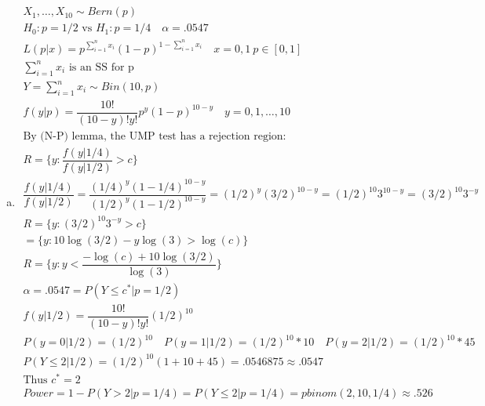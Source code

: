 \documentclass{article}
\newcommand{\sumx}{\sum_{i=1}^{n}x_i}
\begin{document}
\begin{flushleft}
\begin{enumerate}[(a)]
	\item 
\begin{multline*}\\
X_1,\dots,X_{10} \sim Bern(p)\\
H_0:p=1/2 \text{ vs } H_1:p=1/4 \quad \alpha=.0547\\
L(p|x)=p^{\sumx}(1-p)^{1-\sumx} \quad x= 0,1 \ p\in [0,1]\\
\sumx \text{ is an SS for p}\\
Y=\sumx\sim Bin(10,p)\\
f(y|p)=\dfrac{10!}{(10-y)!y!}p^y(1-p)^{10-y} \quad y=0,1,\dots,10\\
\text{By (N-P) lemma, the UMP test has a rejection region:}\\
R=\{y: \dfrac{f(y|1/4)}{f(y|1/2)}>c\}\\
\dfrac{f(y|1/4)}{f(y|1/2)}=\dfrac{(1/4)^y(1-1/4)^{10-y}}{(1/2)^y(1-1/2)^{10-y}}=(1/2)^y(3/2)^{10-y}=(1/2)^{10} 3^{10-y}=(3/2)^{10}3^{-y}\\
R=\{y:(3/2)^{10}3^{-y}>c\}\\
=\{y:10\log(3/2)-y\log(3)>\log(c)\}\\
R=\{y:y<\dfrac{-\log(c)+10\log(3/2)}{\log(3)}\}\\
\alpha=.0547=P(Y\leq c^*|p=1/2)\\
f(y|1/2)=\dfrac{10!}{(10-y)!y!}(1/2)^{10}\\
P(y=0|1/2)=(1/2)^{10} \quad P(y=1|1/2)=(1/2)^{10}*10 \quad P(y=2|1/2)=(1/2)^{10}*45\\
P(Y\leq 2|1/2)=(1/2)^{10}(1+10+45)=.0546875\approx .0547\\
\text{Thus } c^*=2\\
Power=1-P(Y> 2|p=1/4)=P(Y\leq 2|p=1/4)=pbinom(2,10,1/4)\approx .526\\
\end{multline*}


\end{enumerate}
\end{flushleft}
\end{document}
